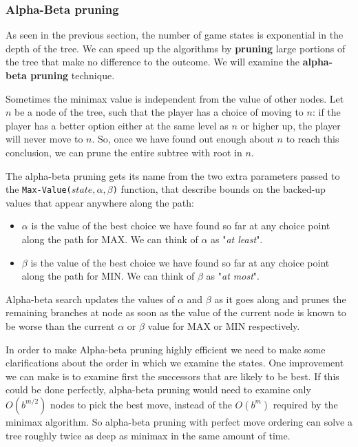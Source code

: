 \documentclass{article}
\begin{document}
\subsubsection{Alpha-Beta pruning}
As seen in the previous section, the number of game states is exponential in the depth of the tree. We can speed up the algorithms by \textbf{pruning} large portions of the tree that make no difference to the outcome. We will examine the \textbf{alpha-beta pruning} technique.

Sometimes the minimax value is independent from the value of other nodes. Let \(n\) be a node of the tree, such that the player has a choice of moving to \(n\): if the player has a better option either at the same level as \(n\) or higher up, the player will never move to \(n\). So, once we have found out enough about \(n\) to reach this conclusion, we can prune the entire subtree with root in \(n\). 

The alpha-beta pruning gets its name from the two extra parameters passed to the \lstinline{Max-Value(}\(state, \alpha, \beta\)\lstinline{)} function, that describe bounds on the backed-up values that appear anywhere along the path:
\begin{itemize}
    \item \(\alpha\) is the value of the best choice we have found so far at any choice point along the path for MAX. We can think of \(\alpha\) as "\textit{at least}".
    \item \(\beta\) is the value of the best choice we have found so far at any choice point along the path for MIN. We can think of \(\beta\) as "\textit{at most}".
\end{itemize}

Alpha-beta search updates the values of \(\alpha\) and \(\beta\) as it goes along and prunes the remaining branches at node as soon as the value of the current node is known to be worse than the current \(\alpha\) or \(\beta\) value for MAX or MIN respectively.

In order to make Alpha-beta pruning highly efficient we need to make some clarifications about the order in which we examine the states. One improvement we can make is to examine first the successors that are likely to be best. If this could be done perfectly, alpha-beta pruning would need to examine only \(O(b^{m/2})\) nodes to pick the best move, instead of the \(O(b^m)\) required by the minimax algorithm. So alpha-beta pruning with perfect move ordering can solve a tree roughly twice as deep as minimax in the same amount of time.
\end{document}
